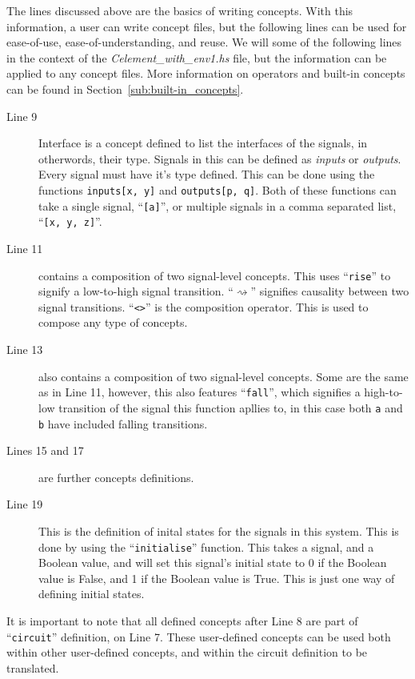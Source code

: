 \documentclass{proc}
\begin{document}
The lines discussed above are the basics of writing concepts. With this information, a user can write concept files, but the following lines can be used for ease-of-use, ease-of-understanding, 
and reuse. We will some of the following lines in the context of the \emph{Celement\_with\_env1.hs} file, but the information can be applied to any concept files. More information on 
operators and built-in concepts can be found in Section~\ref{sub:built-in_concepts}.

\begin{description}
  \item [Line 9] Interface is a concept defined to list the interfaces of the signals, in otherwords, their type. Signals in this can be defined as \emph{inputs} or \emph{outputs}. Every signal
  must have it's type defined. This can be done using the functions \texttt{inputs[x, y]} and \texttt{outputs[p, q]}. Both of these functions can take a single signal, ``\texttt{[a]}'', or 
  multiple signals in a comma separated list, ``\texttt{[x, y, z]}''.
  
  \item [Line 11] contains a composition of two signal-level concepts. This uses ``\texttt{rise}'' to signify a low-to-high signal transition. ``$\rightsquigarrow$'' signifies causality between two 
  signal transitions. ``\texttt{<>}'' is the composition operator. This is used to compose any type of concepts. 
  
  \item [Line 13] also contains a composition of two signal-level concepts. Some are the same as in Line 11, however, this also features ``\texttt{fall}'', which signifies a high-to-low transition 
  of the signal this function apllies to, in this case both \texttt{a} and \texttt{b} have included falling transitions.
  
  \item [Lines 15 and 17] are further concepts definitions.
  
  \item [Line 19] This is the definition of inital states for the signals in this system. This is done by using the ``\texttt{initialise}'' function. This takes a signal, and a Boolean value, and will set 
  this signal's initial state to 0 if the Boolean value is False, and 1 if the Boolean value is True. This is just one way of defining initial states. 

\end{description}

It is important to note that all defined concepts after Line 8 are part of ``\texttt{circuit}'' definition, on Line 7. These user-defined concepts can be used both within other user-defined 
concepts, and within the circuit definition to be translated. 
\end{document}
